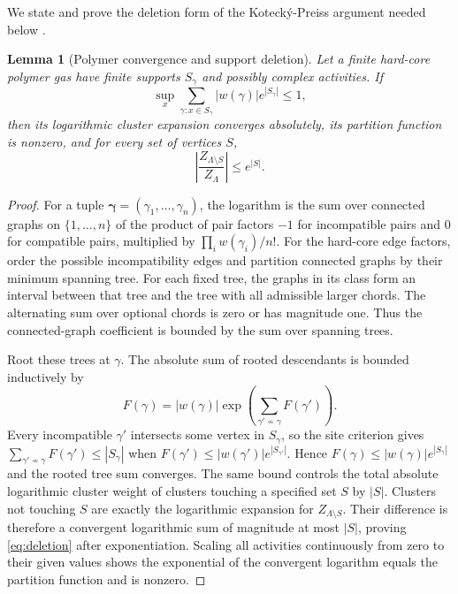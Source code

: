 \documentclass[11pt]{article}
\newtheorem{lemma}{Lemma}
\begin{document}
We state and prove the deletion form of the Koteck\'y-Preiss argument needed below \cite{kp}.
\begin{lemma}[Polymer convergence and support deletion]\label{lem:KP}
Let a finite hard-core polymer gas have finite supports $S_\gamma$ and possibly complex activities. If
\begin{equation}\label{eq:sitecriterion}
 \sup_x\sum_{\gamma:x\in S_\gamma}|w(\gamma)|e^{|S_\gamma|}\le1,
\end{equation}
then its logarithmic cluster expansion converges absolutely, its partition function is nonzero, and for every set of vertices $S$,
\begin{equation}\label{eq:deletion}
 \left|\frac{Z_{\Lambda\setminus S}}{Z_\Lambda}\right|\le e^{|S|}.
\end{equation}
\end{lemma}
\begin{proof}
For a tuple $\boldsymbol\gamma=(\gamma_1,\ldots,\gamma_n)$, the logarithm is the sum over connected graphs on $\{1,\ldots,n\}$ of the product of pair factors $-1$ for incompatible pairs and $0$ for compatible pairs, multiplied by $\prod_iw(\gamma_i)/n!$. For the hard-core edge factors, order the possible incompatibility edges and partition connected graphs by their minimum spanning tree. For each fixed tree, the graphs in its class form an interval between that tree and the tree with all admissible larger chords. The alternating sum over optional chords is zero or has magnitude one. Thus the connected-graph coefficient is bounded by the sum over spanning trees.

Root these trees at $\gamma$. The absolute sum of rooted descendants is bounded inductively by
\[
 F(\gamma)=|w(\gamma)|\exp\!\left(\sum_{\gamma'\not\sim\gamma}F(\gamma')\right).
\]
Every incompatible $\gamma'$ intersects some vertex in $S_\gamma$, so the site criterion gives $\sum_{\gamma'\not\sim\gamma}F(\gamma')\le |S_\gamma|$ when $F(\gamma')\le|w(\gamma')|e^{|S_{\gamma'}|}$. Hence $F(\gamma)\le|w(\gamma)|e^{|S_\gamma|}$ and the rooted tree sum converges. The same bound controls the total absolute logarithmic cluster weight of clusters touching a specified set $S$ by $|S|$. Clusters not touching $S$ are exactly the logarithmic expansion for $Z_{\Lambda\setminus S}$. Their difference is therefore a convergent logarithmic sum of magnitude at most $|S|$, proving \eqref{eq:deletion} after exponentiation. Scaling all activities continuously from zero to their given values shows the exponential of the convergent logarithm equals the partition function and is nonzero.
\end{proof}
\end{document}
